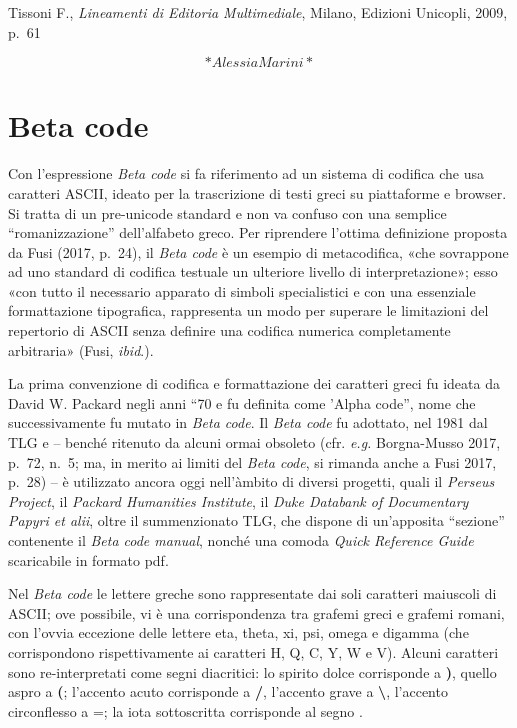 \documentclass[
  b5paper,
  twoside,
  11pt,
  chapterprefix=false,
  bibliography=totocnumbered,
  listof=flat]{scrbook}
\begin{document}
Tissoni F., \emph{Lineamenti di Editoria Multimediale}, Milano, Edizioni
Unicopli, 2009, p.~61

\[*Alessia Marini*\]

\hypertarget{beta-code}{%
\chapter{Beta code}\label{beta-code}}

Con l'espressione \emph{Beta code} si fa riferimento ad un sistema di
codifica che usa caratteri ASCII, ideato per la trascrizione di testi
greci su piattaforme e browser. Si tratta di un pre-unicode standard e
non va confuso con una semplice \enquote{romanizzazione} dell'alfabeto greco.
Per riprendere l'ottima definizione proposta da Fusi (2017, p.~24), il
\emph{Beta code} è un esempio di metacodifica, «che sovrappone ad uno
standard di codifica testuale un ulteriore livello di interpretazione»;
esso «con tutto il necessario apparato di simboli specialistici e con
una essenziale formattazione tipografica, rappresenta un modo per
superare le limitazioni del repertorio di ASCII senza definire una
codifica numerica completamente arbitraria» (Fusi, \emph{ibid}.).~

La prima convenzione di codifica e formattazione dei caratteri greci fu
ideata da David W. Packard negli anni \enquote{70 e fu definita come 'Alpha
code}, nome che successivamente fu mutato in \emph{Beta code}. Il \emph{Beta code}
fu adottato, nel 1981 dal TLG e -- benché ritenuto da alcuni ormai
obsoleto (cfr. \emph{e.g.} Borgna-Musso 2017, p.~72, n.~5; ma, in merito ai
limiti del \emph{Beta code}, si rimanda anche a Fusi 2017, p.~28) -- è
utilizzato ancora oggi nell'àmbito di diversi progetti, quali il
\emph{Perseus Project}, il \emph{Packard Humanities Institute}, il \emph{Duke Databank
of Documentary Papyri et alii}, oltre il summenzionato TLG, che dispone
di un'apposita \enquote{sezione} contenente il \emph{Beta code manual}, nonché una
comoda \emph{Quick Reference Guide} scaricabile in formato pdf.

Nel \emph{Beta code} le lettere greche sono rappresentate dai soli caratteri
maiuscoli di ASCII; ove possibile, vi è una corrispondenza tra grafemi
greci e grafemi romani, con l'ovvia eccezione delle lettere eta, theta,
xi, psi, omega e digamma (che corrispondono rispettivamente ai caratteri
H, Q, C, Y, W e V). Alcuni caratteri sono re-interpretati come segni
diacritici: lo spirito dolce corrisponde a \textbf{)}, quello aspro a \textbf{(};
l'accento acuto corrisponde a \textbf{/}, l'accento grave a \textbf{\textbackslash{}}, l'accento
circonflesso a =; la iota sottoscritta corrisponde al segno \textbar.
\end{document}
